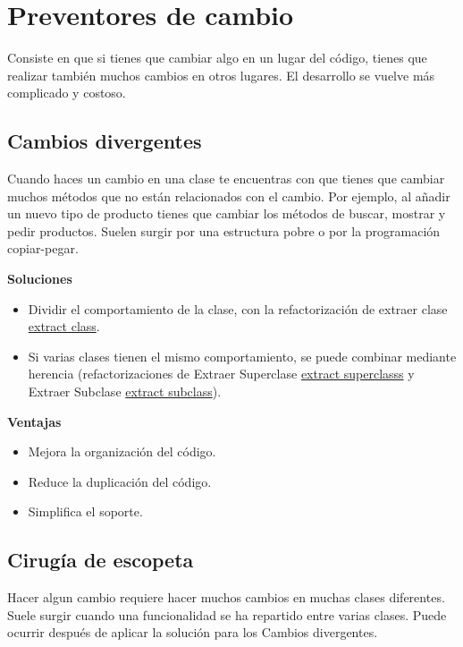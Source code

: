 \documentclass[11pt,a4paper,oneside]{book}
\begin{document}
\section{Preventores de cambio}

Consiste en que si tienes que cambiar algo en un lugar del código, tienes que realizar también muchos cambios en otros lugares. El desarrollo se vuelve más complicado y costoso.

\subsection{Cambios divergentes}
\label{cambiosdivergentes}
Cuando haces un cambio en una clase te encuentras con que tienes que cambiar muchos métodos que no están relacionados con el cambio. Por ejemplo, al añadir un nuevo tipo de producto tienes que cambiar los métodos de buscar, mostrar y pedir productos.
\newline
Suelen surgir por una estructura pobre o por la programación copiar-pegar.

\textbf{Soluciones}
\begin{itemize}
    \item Dividir el comportamiento de la clase, con la refactorización de extraer clase  \hyperref[extractclass]{extract class}.
    \item Si varias clases tienen el mismo comportamiento, se puede combinar mediante herencia (refactorizaciones de Extraer Superclase \hyperref[extractsuperclass]{extract superclasss} y Extraer Subclase \hyperref[extractsubclass]{extract subclass}).
\end{itemize} 

\textbf{Ventajas}
\begin{itemize}
    \item Mejora la organización del código.
    \item Reduce la duplicación del código.
    \item Simplifica el soporte.
\end{itemize}

\subsection{Cirugía de escopeta}
Hacer algun cambio requiere hacer muchos cambios en muchas clases diferentes.
\newline
Suele surgir cuando una funcionalidad se ha repartido entre varias clases. Puede ocurrir después de aplicar la solución para los Cambios divergentes.
\end{document}
